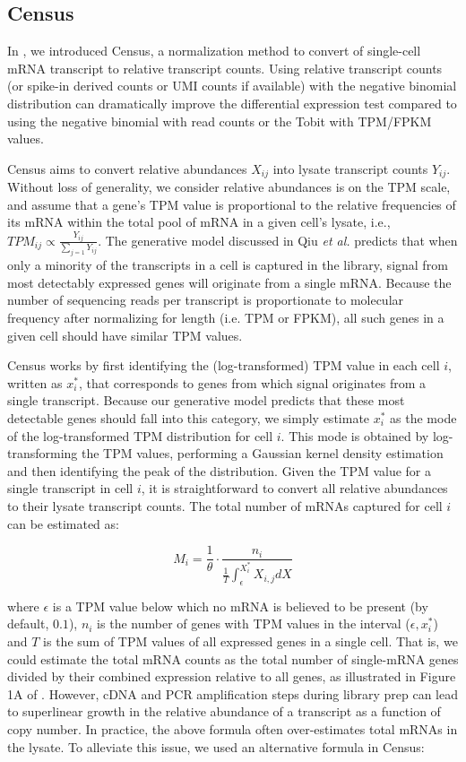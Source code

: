 \documentclass[10pt,oneside]{article}\usepackage[]{graphicx}\usepackage[]{color}
\begin{document}
\subsection{Census}\label{Census}
In \cite{qiu2017single}, we introduced Census, a normalization method to convert of single-cell mRNA transcript to relative transcript counts. Using relative transcript counts (or spike-in derived counts or UMI counts if available) with the negative binomial distribution can dramatically improve the differential expression test compared to using the negative binomial with read counts or the Tobit with TPM/FPKM values. 

Census aims to convert relative abundances $X_{ij}$ into lysate transcript counts $Y_{ij}$. Without loss of generality, we consider relative abundances is on the TPM scale, and assume that a gene's TPM value is proportional to the relative frequencies of its mRNA within the total pool of mRNA in a given cell's lysate, i.e., $TPM_{ij} \propto \frac{Y_{ij}}{\sum_{j = 1}Y_{ij}}$.  The generative model discussed in Qiu \emph{et al.} predicts that when only a minority of the transcripts in a cell is captured in the library, signal from most detectably expressed genes will originate from a single mRNA.  Because the number of sequencing reads per transcript is proportionate to molecular frequency after normalizing for length (i.e. TPM or FPKM), all such genes in a given cell should have similar TPM values.  

Census works by first identifying the (log-transformed) TPM value in each cell $i$, written as $x_i^*$, that corresponds to genes from which signal originates from a single transcript. Because our generative model predicts that these most detectable genes should fall into this category, we simply estimate $x_i^*$ as the mode of the log-transformed TPM distribution for cell $i$. This mode is obtained by log-transforming the TPM values, performing a Gaussian kernel density estimation and then identifying the peak of the distribution. Given the TPM value for a single transcript in cell $i$, it is straightforward to convert all relative abundances to their lysate transcript counts. The total number of mRNAs captured for cell $i$ can be estimated as:

\begin{equation}
M_i = \frac{1}{\theta} \cdot \frac{n_i}{\frac{1}{T} \int_{\epsilon}^{X_i^*}X_{i,j}dX}
\end{equation}

where $\epsilon$ is a TPM value below which no mRNA is believed to be present (by default, $0.1$), $n_i$ is the number of genes with TPM values in the interval ($\epsilon, x_i^*$) and $T$ is the sum of TPM values of all expressed genes in a single cell. That is, we could estimate the total mRNA counts as the total number of single-mRNA genes divided by their combined expression relative to all genes, as illustrated in Figure 1A of \cite{qiu2017single}. However, cDNA and PCR amplification steps during library prep can lead to superlinear growth in the relative abundance of a transcript as a function of copy number. In practice, the above formula often over-estimates total mRNAs in the lysate. To alleviate this issue, we used an alternative formula in Census:
\end{document}
